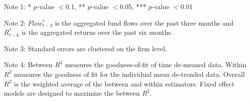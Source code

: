{\begin{center}
\begin{threeparttable}
\begin{tablenotes}
      \scriptsize
      \item Note 1: * $p$-value $<$0.1, ** $p$-value $<$0.05, *** $p$-value $<$0.01
      \item Note 2: $Flow^*_{t-3}$ is the aggregated fund flows over the past three months and $R^*_{t-6}$ is the aggregated returns over the past six months.
      \item Note 3: Standard errors are clustered on the firm level.
      \item Note 4: Between $R^2$ measures the goodness-of-fit of time de-meaned data. Within $R^2$ measures the goodness of fit for the individual mean de-trended data. Overall $R^2$ is the weighted average of the between and within estimators. Fixed effect models are designed to maximize the between $R^2$.
      \end{tablenotes}
    \end{threeparttable}
  \end{center}
}
